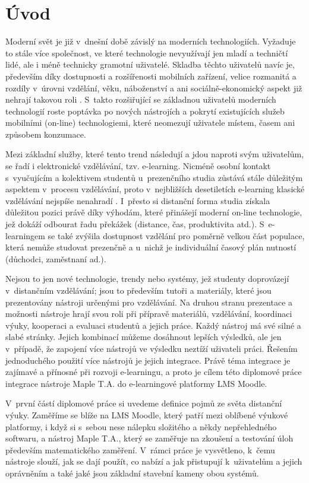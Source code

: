 \documentclass[
print,
  11pt,
  table,   
  nolof,    
  nolot,
  oneside,
  draft
]{fithesis3}
\begin{document}
\chapter{Úvod}


Moderní svět je již v~dnešní době závislý na moderních technologiích. Vyžaduje to stále více společnost, ve které technologie nevyužívají jen mladí a techničtí lidé, ale i méně technicky gramotní uživatelé. Skladba těchto uživatelů navíc je, především díky dostupnosti a rozšířenosti mobilních zařízení, velice rozmanitá a rozdíly v~úrovni vzdělání, věku, náboženství a ani sociálně-ekonomický aspekt již nehrají takovou roli \cite{itustats}. S~takto rozšiřující se základnou uživatelů moderních technologií roste poptávka po nových nástrojích a pokrytí existujících služeb mobilními (on-line) technologiemi, které neomezují uživatele místem, časem ani způsobem konzumace.


Mezi základní služby, které tento trend následují a jdou naproti svým uživatelům, se řadí i elektronické vzdělávání, tzv. e-learning. Nicméně osob\-ní kontakt s~vyučujícím a kolektivem studentů u~prezenčního studia zůstává stále důležitým aspektem v~procesu vzdělávání, proto v~nejbližších desetiletích e-learning klasické vzdělávání nejspíše nenahradí \cite{techvsteach}. I~přesto si distanční forma studia získala důležitou pozici právě díky výhodám, které přinášejí moderní on-line technologie, jež dokáží odbourat řadu překážek (distance, čas, produktivita atd.). S~e-learningem se také zvýšila dostupnost vzdělání pro poměrně velkou část populace, která nemůže studovat prezenčně a u~nichž je individuální časový plán nutností (důchodci, zaměstnaní ad.).

Nejsou to jen nové technologie, trendy nebo systémy, jež studenty doprovázejí v~distančním vzdělávání; jsou to především tutoři a materiály, které jsou prezentovány nástroji určenými pro vzdělávání. Na druhou stranu prezentace a možnosti nástroje hrají svou roli při přípravě materiálů, vzdělávání, koordinaci výuky, kooperaci a evaluaci studentů a jejich práce. Každý nástroj má své silné a slabé stránky. Jejich kombinací můžeme dosáhnout lepších výsledků, ale jen v~případě, že zapojení více nástrojů ve výsledku neztíží uživateli práci. Řešením jednoduchého použití více nástrojů je jejich integrace. Právě téma integrace je zajímavé a přínosné při rozvoji e-learningu, a proto je cílem této diplomové práce integrace nástroje Maple T.A. do e-learn\-ingové platformy LMS Moodle.

V~první částí diplomové práce si uvedeme definice pojmů ze světa distan\-ční výuky. Zaměříme se blíže na LMS Moodle, který patří mezi oblíbené výukové platformy, i když si s~sebou nese nálepku složitého a někdy nepřehledného softwaru, a nástroj Maple T.A., který se zaměřuje na zkoušení a testování úloh především matematického zaměření. V~rámci práce je vysvětleno, k~čemu nástroje slouží, jak se dají použít, co nabízí a jak přistupují k~uživatelům a jejich oprávněním a také jaké jsou základní stavební kameny obou systémů.
\end{document}
